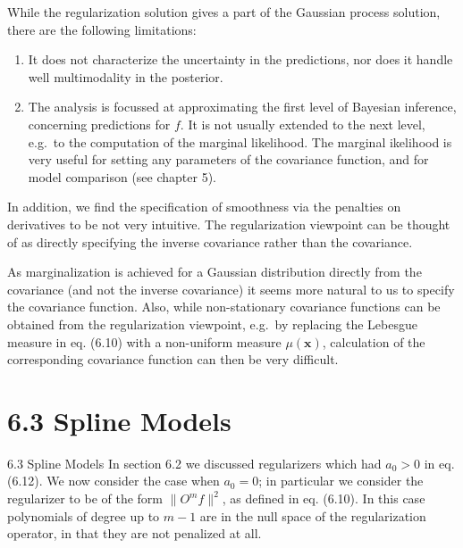 \documentclass[
  ignorenonframetext,
]{beamer}
\begin{document}
\begin{frame}{}
\protect\hypertarget{section-14}{}
While the regularization solution gives a part of the Gaussian process
solution, there are the following limitations:

\begin{enumerate}
\item
  It does not characterize the uncertainty in the predictions, nor does
  it handle well multimodality in the posterior.
\item
  The analysis is focussed at approximating the first level of Bayesian
  inference, concerning predictions for \(f\). It is not usually
  extended to the next level, e.g.~to the computation of the marginal
  likelihood. The marginal ikelihood is very useful for setting any
  parameters of the covariance function, and for model comparison (see
  chapter 5).
\end{enumerate}
\end{frame}

\begin{frame}{}
\protect\hypertarget{section-15}{}
In addition, we find the specification of smoothness via the penalties
on derivatives to be not very intuitive. The regularization viewpoint
can be thought of as directly specifying the inverse covariance rather
than the covariance.

As marginalization is achieved for a Gaussian distribution directly from
the covariance (and not the inverse covariance) it seems more natural to
us to specify the covariance function. Also, while non-stationary
covariance functions can be obtained from the regularization viewpoint,
e.g.~by replacing the Lebesgue measure in eq. (6.10) with a non-uniform
measure \(\mu (\pmb x)\), calculation of the corresponding covariance
function can then be very difficult.
\end{frame}

\hypertarget{spline-models}{%
\section{6.3 Spline Models}\label{spline-models}}

\begin{frame}{6.3 Spline Models}
In section 6.2 we discussed regularizers which had \(a_0 > 0\) in eq.
(6.12). We now consider the case when \(a_0 = 0\); in particular we
consider the regularizer to be of the form \(\|O^mf\|^2\), as defined in
eq. (6.10). In this case polynomials of degree up to \(m − 1\) are in
the null space of the regularization operator, in that they are not
penalized at all.
\end{frame}
\end{document}
